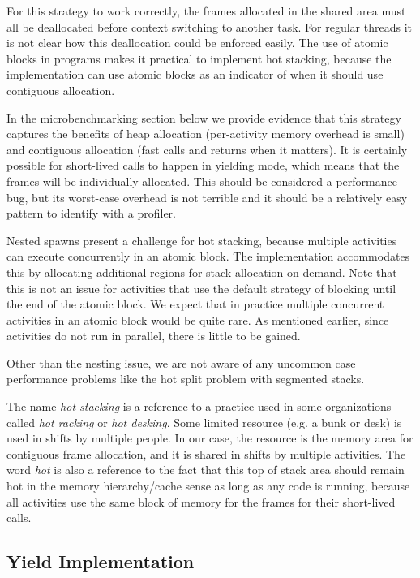 \documentclass[sigplan,10pt,review,anonymous]{acmart}\settopmatter{printfolios=true,printccs=false,printacmref=false}
\begin{document}
For this strategy to work correctly, the frames allocated in the shared area must all be deallocated before context switching to another task.
For regular threads it is not clear how this deallocation could be enforced easily.
The use of atomic blocks in programs makes it practical to implement hot stacking, because the implementation can use atomic blocks as an indicator of when it should use contiguous allocation.

In the microbenchmarking section below we provide evidence that this strategy captures the benefits of heap allocation (per-activity memory overhead is small) and contiguous allocation (fast calls and returns when it matters).
It is certainly possible for short-lived calls to happen in yielding mode, which means that the frames will be individually allocated.
This should be considered a performance bug, but its worst-case overhead is not terrible and it should be a relatively easy pattern to identify with a profiler.

Nested spawns present a challenge for hot stacking, because multiple activities can execute concurrently in an atomic block.
The implementation accommodates this by allocating additional regions for stack allocation on demand.
Note that this is not an issue for activities that use the default strategy of blocking until the end of the atomic block.
We expect that in practice multiple concurrent activities in an atomic block would be quite rare.
As mentioned earlier, since activities do not run in parallel, there is little to be gained.

Other than the nesting issue, we are not aware of any uncommon case performance problems like the hot split problem with segmented stacks.

The name \emph{hot stacking} is a reference to a practice used in some organizations called \emph{hot racking} or \emph{hot desking}.
Some limited resource (e.g. a bunk or desk) is used in shifts by multiple people.
In our case, the resource is the memory area for contiguous frame allocation, and it is shared in shifts by multiple activities.
The word \emph{hot} is also a reference to the fact that this top of stack area should remain hot in the memory hierarchy/cache sense as long as any code is running, because all activities use the same block of memory for the frames for their short-lived calls.

\subsection{Yield Implementation}
\label{sec:yield_imp}
\end{document}
